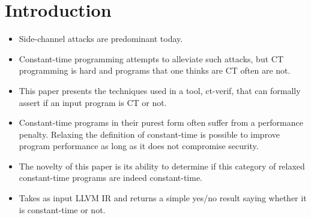 \section{Introduction}

\begin{itemize}
  \item Side-channel attacks are predominant today.
  \item Constant-time programming attempts to alleviate such attacks, but CT programming is hard and programs that one thinks are CT often are not.
  \item This paper presents the techniques used in a tool, ct-verif, that can formally assert if an input program is CT or not.
  \item Constant-time programs in their purest form often suffer from a performance penalty. Relaxing the definition of constant-time is possible to improve program performance as long as it does not compromise security.
  \item The novelty of this paper is its ability to determine if this category of relaxed constant-time programs are indeed constant-time.
  \item Takes as input LLVM IR and returns a simple yes/no result saying whether it is constant-time or not.
\end{itemize}
